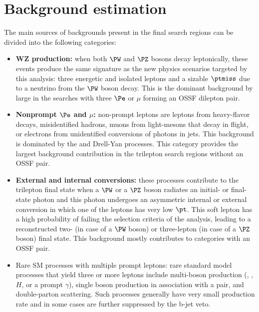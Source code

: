 \section{Background estimation}\label{sec:bgk}
The main sources of backgrounds present in the final search regions can be divided into the following categories:
\begin{itemize}
\setlength\itemsep{-0.1em}
\item {\bf WZ production:} when both $\PW$ and $\PZ$ bosons decay leptonically, these events produce the same signature as the new physics scenarios targeted by this analysis: three energetic and isolated leptons and a sizable $\ptmiss$ due to a neutrino from the $\PW$ boson decay. This is the dominant background by large in the searches with three $\Pe$ or $\mu$ forming an OSSF dilepton pair.

\item {\bf Nonprompt $\Pe$ and $\mu$:} non-prompt leptons are leptons from heavy-flavor decays, misidentified hadrons, muons from light-mesons that decay in flight, or electrons from unidentified conversions of  photons in jets. This background is dominated by the \ttbar and Drell-Yan processes. This category provides the largest background contribution in the trilepton search regions without an OSSF pair. 

\item {\bf External and internal conversions:} these processes contribute to the trilepton final state when a $\PW$ or a $\PZ$ boson radiates an initial- or final-state photon and this photon undergoes an asymmetric internal or external conversion in which one of the leptons has very low $\pt$. This soft lepton has a high probability of failing the selection criteria of the analysis, leading to a reconstructed two- (in case of a $\PW$ boson) or three-lepton (in case of a $\PZ$ boson) final state. This background mostly contributes to categories with an OSSF pair.

\item Rare SM processes with multiple prompt leptons: rare standard model processes that yield three or more leptons include multi-boson production (\PW, \PZ, $H$, or a prompt $\gamma$), single boson production in association with a \ttbar pair, and double-parton scattering. Such processes generally have very small production rate and in some cases are 
further suppressed by the b-jet veto. 
\end{itemize}

